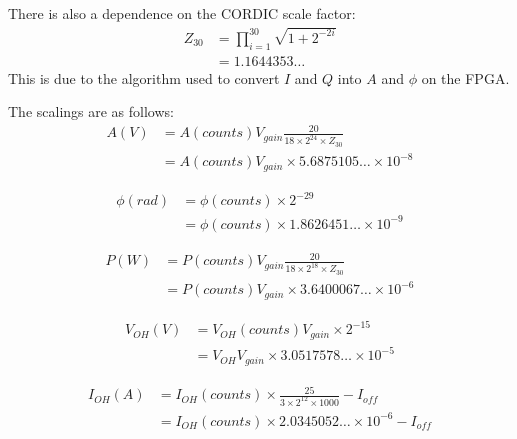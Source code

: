 \documentclass[12pt,a4paper]{article}
\begin{document}
There is also a dependence on the CORDIC scale factor:
\begin{equation}
  \label{equ:cordic}
  \begin{split}
    Z_{30} &= \prod_{i=1}^{30}\sqrt{1 + 2^{-2i}} \\
    &= 1.1644353\ldots
  \end{split}
\end{equation}
This is due to the algorithm used to convert $I$ and $Q$ into $A$ and $\phi$ on the FPGA\@.

The scalings are as follows:
\begin{equation}
  \label{equ:avolts}
  \begin{split}
    A(V) &= A(counts) V_{gain} \frac{20}{18 \times 2^{24} \times Z_{30}} \\
    &= A(counts) V_{gain} \times 5.6875105\ldots \times 10^{-8}
  \end{split}
\end{equation}

\begin{equation}
  \label{equ:phirad}
  \begin{split}
    \phi(rad) &= \phi(counts) \times 2^{-29} \\
    &= \phi(counts) \times 1.8626451\ldots \times 10^{-9}
  \end{split}
\end{equation}

\begin{equation}
  \label{equ:pwatts}
  \begin{split}
    P(W) &= P(counts) V_{gain} \frac{20}{18 \times 2^{18} \times Z_{30}} \\
    &= P(counts) V_{gain} \times 3.6400067\ldots \times 10^{-6}
  \end{split}
\end{equation}

\begin{equation}
  \label{equ:vdcvolts}
  \begin{split}
    V_{OH}(V) &= V_{OH}(counts) V_{gain} \times 2^{-15} \\
    &= V_{OH} V_{gain} \times 3.0517578\ldots \times 10^{-5}
  \end{split}
\end{equation}

\begin{equation}
  \label{equ:curramps}
  \begin{split}
    I_{OH}(A) &= I_{OH}(counts) \times \frac{25}{3 \times 2^{12} \times 1000} - I_{off} \\
    &= I_{OH}(counts) \times 2.0345052\ldots \times 10^{-6} - I_{off}
  \end{split}
\end{equation}
\end{document}
